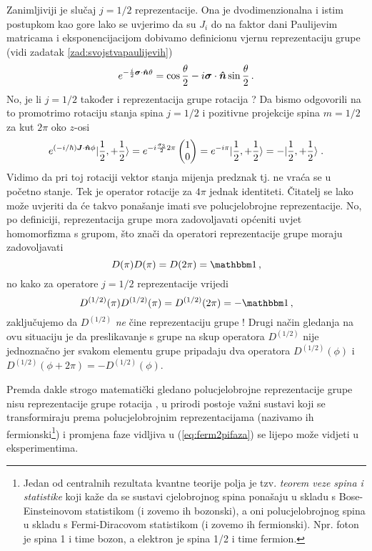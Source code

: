 Zanimljiviji je slučaj $j=1/2$ reprezentacije. Ona je dvodimenzionalna i
istim postupkom kao gore lako se uvjerimo da su $J_i$ do na faktor
dani Paulijevim matricama i eksponencijacijom dobivamo definicionu
vjernu reprezentaciju grupe  (vidi zadatak  \ref{zad:svojstvapaulijevih})
\begin{equation}
 e^{-\frac{i}{2}\vec{\sigma}\cdot\unitn \theta} =
\cos \frac{\theta}{2}-i\vec{\sigma}\cdot\unitn \sin\frac{\theta}{2} \,.
\end{equation}
No, je li $j=1/2$ također i reprezentacija grupe rotacija ?
Da bismo odgovorili na to promotrimo rotaciju 
stanja spina $j=1/2$ i pozitivne projekcije spina $m=1/2$ za 
kut $2\pi$ oko $z$-osi
\begin{equation}
    e^{(-i/\hbar)\vec{J}\cdot\unitn\phi}\ket{\frac{1}{2}, +\frac{1}{2}} =
    e^{-i\frac{\sigma_3}{2} 2 \pi} \begin{pmatrix} 1 \\ 0 \end{pmatrix} =
    e^{-i \pi}\ket{\frac{1}{2}, +\frac{1}{2}} =
    -\ket{\frac{1}{2}, +\frac{1}{2}} \;.
    \label{eq:ferm2pifaza}
\end{equation}
Vidimo da pri toj rotaciji vektor stanja mijenja predznak tj. ne vraća se u početno stanje.
Tek je operator rotacije za $4\pi$ jednak identiteti.  Čitatelj
se lako može uvjeriti da će takvo ponašanje imati sve polucjelobrojne
reprezentacije.
No, po definiciji, reprezentacija grupe  mora zadovoljavati
općeniti uvjet homomorfizma s grupom, što znači da operatori
reprezentacije grupe  moraju zadovoljavati
\begin{equation}
    D(\pi)D(\pi)=D(2\pi)=\Eins \,,
\end{equation}
no kako za operatore $j=1/2$ reprezentacije vrijedi
\begin{equation}
    D^{(1/2)}(\pi)D^{(1/2)}(\pi)=D^{(1/2)}(2\pi)=-\Eins \,,
\end{equation}
zaključujemo da $D^{(1/2)}$
\emph{ne} čine reprezentaciju grupe ! Drugi način gledanja
na ovu situaciju je da preslikavanje s grupe  na
skup operatora  $D^{(1/2)}$ nije jednoznačno jer svakom elementu
grupe pripadaju dva operatora $D^{(1/2)}(\phi)$ i 
$D^{(1/2)}(\phi + 2\pi) = -D^{(1/2)}(\phi)$.

Premda dakle strogo matematički gledano polucjelobrojne reprezentacije
gru\-pe  nisu reprezentacije grupe rotacija , u prirodi
postoje važni sustavi koji se transformiraju prema polucjelobrojnim
reprezentacijama (nazivamo ih fermionski\footnote{%
Jedan od centralnih rezultata kvantne teorije polja je tzv.
\emph{teorem  veze spina i statistike} koji kaže da se sustavi
cjelobrojnog spina ponašaju u skladu s Bose-Einsteinovom
statistikom (i zovemo ih bozonski), a oni polucjelobrojnog spina
u skladu s Fermi-Diracovom statistikom (i zovemo ih fermionski).
Npr. foton je spina 1 i time bozon, a elektron je spina 1/2 i time fermion.})
 i promjena faze vidljiva u (\ref{eq:ferm2pifaza})
se lijepo može vidjeti u eksperimentima.

